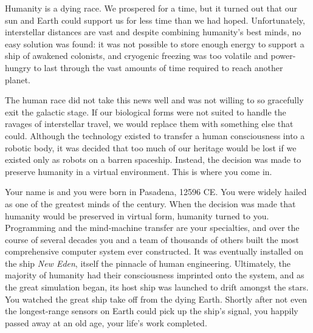 \documentclass[char]{guildcamp1}
\begin{document}
\name{\cProgrammer{}}

Humanity is a dying race. We prospered for a time, but it turned out that our sun and Earth could support us for less time than we had hoped. Unfortunately, interstellar distances are vast and despite combining humanity's best minds, no easy solution was found: it was not possible to store enough energy to support a ship of awakened colonists, and cryogenic freezing was too volatile and power-hungry to last through the vast amounts of time required to reach another planet.

The human race did not take this news well and was not willing to so gracefully exit the galactic stage. If our biological forms were not suited to handle the ravages of interstellar travel, we would replace them with something else that could. Although the technology existed to transfer a human consciousness into a robotic body, it was decided that too much of our heritage would be lost if we existed only as robots on a barren spaceship. Instead, the decision was made to preserve humanity in a virtual environment. This is where you come in.

Your name is \cProgrammer{\intro} and you were born in Pasadena, 12596 CE. You were widely hailed as one of the greatest minds of the century. When the decision was made that humanity would be preserved in virtual form, humanity turned to you. Programming and the mind-machine transfer are your specialties, and over the course of several decades you and a team of thousands of others built the most comprehensive computer system ever constructed. It was eventually installed on the ship \emph{New Eden}, itself the pinnacle of human engineering. Ultimately, the majority of humanity had their consciousness imprinted onto the system, and as the great simulation began, its host ship was launched to drift amongst the stars. You watched the great ship take off from the dying Earth. Shortly after not even the longest-range sensors on Earth could pick up the ship's signal, you happily passed away at an old age, your life's work completed.
\end{document}
